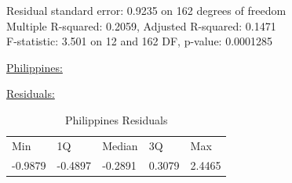 \documentclass[11pt]{article}
\begin{document}
Residual standard error: 0.9235 on 162 degrees of freedom\\
Multiple R-squared:  0.2059, Adjusted R-squared:  0.1471 \\
F-statistic: 3.501 on 12 and 162 DF,  p-value: 0.0001285

\newpage

\begin{center} \underline{Philippines:} \\ \end{center}
\underline{Residuals:}
\FloatBarrier
\begin{table}[!htbp]
\begin{tabular}{lllll}
Min     & 1Q      & Median  & 3Q     & Max    \\
-0.9879 & -0.4897 & -0.2891 & 0.3079 & 2.4465
\end{tabular}
\centering
\caption{Philippines Residuals}
\label{table11}
\end{table}
\FloatBarrier
\end{document}
